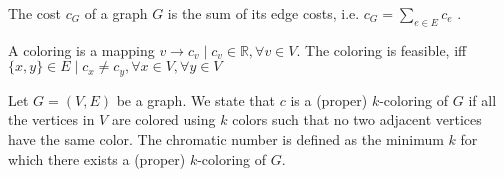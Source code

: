 \begin{definition}
The cost $c_G$ of a graph $G$ is the sum of its edge costs, i.e. $c_G = \sum_{e\in E}c_e$ .
\end{definition}
\begin{definition}[Coloring]
A coloring is a mapping $v \rightarrow c_v \mid c_v \in \mathbb{R}, \forall v\in V$. The coloring is feasible, iff $\{x,y\}\in E \mid c_x \neq c_y, \forall x\in V, \forall y\in V$
\end{definition}
\begin{definition}
Let $G = (V, E)$ be a graph. We state that $c$ is a (proper) $k$-coloring of $G$ if all the vertices in $V$ are colored using $k$ colors such that no two adjacent vertices have the same color. The chromatic number is defined as the minimum $k$ for which there exists a (proper) $k$-coloring of $G$.
\end{definition}
